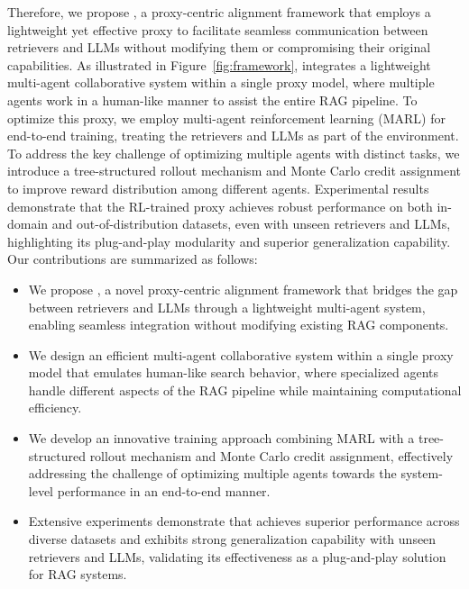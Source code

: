 Therefore, we propose \modelname, a proxy-centric alignment framework that employs a lightweight yet effective proxy to facilitate seamless communication between retrievers and LLMs without modifying them or compromising their original capabilities. 
As illustrated in Figure~\ref{fig:framework}, \modelname integrates a lightweight multi-agent collaborative system within a single proxy model, where multiple agents work in a human-like manner to assist the entire RAG pipeline. 
To optimize this proxy, we employ multi-agent reinforcement learning (MARL) for end-to-end training, treating the retrievers and LLMs as part of the environment. 
To address the key challenge of optimizing multiple agents with distinct tasks, we introduce a tree-structured rollout mechanism and Monte Carlo credit assignment to improve reward distribution among different agents.
Experimental results demonstrate that the RL-trained proxy achieves robust performance on both in-domain and out-of-distribution datasets, even with unseen retrievers and LLMs, highlighting its plug-and-play modularity and superior generalization capability.
Our contributions are summarized as follows:
\begin{itemize}[topsep=1pt, partopsep=1pt, leftmargin=12pt, itemsep=-1pt]
    \item We propose \modelname, a novel proxy-centric alignment framework that bridges the gap between retrievers and LLMs through a lightweight multi-agent system, enabling seamless integration without modifying existing RAG components.
    \item We design an efficient multi-agent collaborative system within a single proxy model that emulates human-like search behavior, where specialized agents handle different aspects of the RAG pipeline while maintaining computational efficiency.
    \item We develop an innovative training approach combining MARL with a tree-structured rollout mechanism and Monte Carlo credit assignment, effectively addressing the challenge of optimizing multiple agents towards the system-level performance in an end-to-end manner.    
    \item Extensive experiments demonstrate that \modelname achieves superior performance across diverse datasets and exhibits strong generalization capability with unseen retrievers and LLMs, validating its effectiveness as a plug-and-play solution for RAG systems.
\end{itemize}

